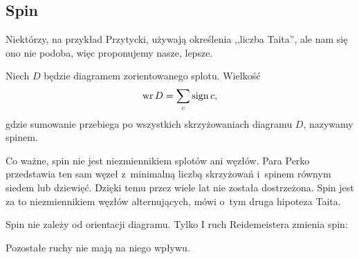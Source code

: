 
\subsection{Spin}
%

Niektórzy, na przykład Przytycki, używają określenia ,,liczba Taita'', ale nam się ono nie podoba, więc proponujemy nasze, lepsze.
%

\begin{definition}[spin]
    Niech $D$ będzie diagramem zorientowanego splotu.
    Wielkość
    \begin{equation}
        \operatorname{wr} D = \sum_c \operatorname{sign} c,
    \end{equation}
    gdzie sumowanie przebiega po wszystkich skrzyżowaniach diagramu $D$, nazywamy spinem.
\end{definition}

Co ważne, spin nie jest niezmiennikiem splotów ani węzłów.
Para Perko przedstawia ten sam węzeł z~minimalną liczbą skrzyżowań i~spinem równym siedem lub dziewięć.
%
Dzięki temu przez wiele lat nie została dostrzeżona.
Spin jest za to niezmiennikiem węzłów alternujących, mówi o~tym druga hipoteza Taita.
%

\begin{lemma}
\label{lem:writhe_reidemeister}%
    Spin nie zależy od orientacji diagramu.
    Tylko I ruch Reidemeistera zmienia spin:
\begin{comment}
    \begin{equation}
        \writhe \left(\MediumReidemeisterOneLeft\right) =
        \writhe \left(\MediumReidemeisterOneStraight\right) - 1.
    \end{equation}
\end{comment}
    Pozostałe ruchy nie mają na niego wpływu.
\end{lemma}

%



